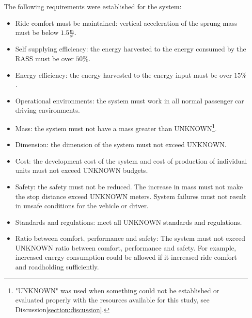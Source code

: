 The following requirements were established for the system:
\begin{itemize}
    \item Ride comfort must be maintained: vertical acceleration of the sprung mass must be below $1.5\frac{\text{m}}{\text{s}^2}$\:\cite{liuTransmissionEnergyharvestingStudy2021}.
    \item Self supplying efficiency: the energy harvested to the energy consumed by the RASS must be over $50\%$\:\cite{liuTransmissionEnergyharvestingStudy2021}.
    \item Energy efficiency: the energy harvested to the energy input must be over $15\%$\:\cite{liuModelingSimulationEnergyRegenerative2019}.
    \item Operational environments: the system must work in all normal passenger car driving environments.
    \item Mass: the system must not have a mass greater than UNKNOWN\footnote{"UNKNOWN" was used when something could not be established or evaluated properly with the resources available for this study, see Discussion\:\ref{section:discussion}.}.
    \item Dimension: the dimension of the system must not exceed UNKNOWN.
    \item Cost: the development cost of the system and cost of production of individual units must not exceed UNKNOWN budgets.
    \item Safety: the safety must not be reduced. The increase in mass must not make the stop distance exceed UNKNOWN meters. System failures must not result in unsafe conditions for the vehicle or driver.
    \item Standards and regulations: meet all UNKNOWN standards and regulations.
    \item Ratio between comfort, performance and safety: The system must not exceed UNKNOWN ratio between comfort, performance and safety. For example, increased energy consumption could be allowed if it increased ride comfort and roadholding sufficiently. 
\end{itemize}

